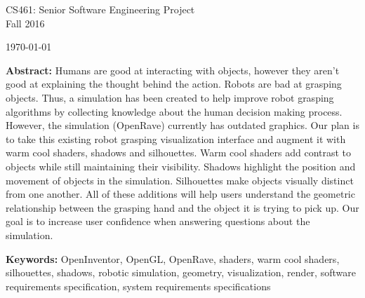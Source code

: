 \documentclass[10pt,journal,compsoc]{IEEEtran}
\begin{document}
\begin{titlepage}
\begin{flushleft}
\begin{bfseries}
\end{bfseries}

\vspace{15mm}
\Large{CS461: Senior Software Engineering Project} \\
\Large{Fall 2016} \\

\vspace{10mm}

\today

\vfill

\begin{large}
{\bf Abstract:}
Humans are good at interacting with objects, however they aren't good at explaining the thought behind the action.
Robots are bad at grasping objects.
Thus, a simulation has been created to help improve robot grasping algorithms by collecting knowledge about the human decision making process.
However, the simulation (OpenRave) currently has outdated graphics.
Our plan is to take this existing robot grasping visualization interface and augment it with warm cool shaders, shadows and silhouettes.
Warm cool shaders add contrast to objects while still maintaining their visibility.
Shadows highlight the position and movement of objects in the simulation.
Silhouettes make objects visually distinct from one another.
All of these additions will help users understand the geometric relationship between the grasping hand and the object it is trying to pick up. 
Our goal is to increase user confidence when answering questions about the simulation.

{\bf Keywords:} OpenInventor, OpenGL, OpenRave, shaders, warm cool shaders, silhouettes, shadows, robotic simulation, geometry, visualization, render,
software requirements specification, system requirements specifications
\end{large}
\end{flushleft}

\newpage

\end{titlepage}
\end{document}
